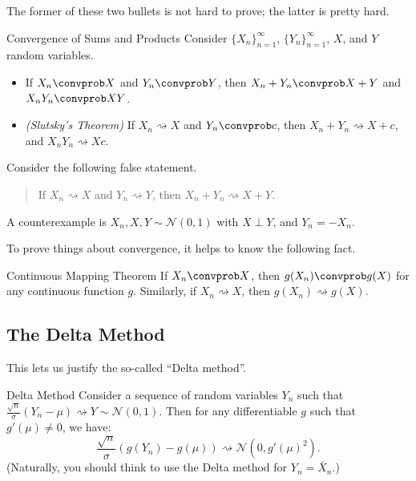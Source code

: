 The former of these two bullets is not hard to prove; the latter is pretty hard.

\begin{theorem}{Convergence of Sums and Products}
    Consider $\{X_n\}_{n = 1}^{\infty}$, $\{Y_n\}_{n = 1}^{\infty}$,
    $X$, and $Y$ random variables.
    \begin{itemize}
        \item If $X_n \convprob X$ and
        $Y_n \convprob Y$, then $X_n + Y_n \convprob X + Y$
        and $X_nY_n \convprob XY$.
        \item \emph{(Slutsky's Theorem)} If $X_n \rightsquigarrow X$ and
        $Y_n \convprob c$, then $X_n + Y_n \rightsquigarrow X + c$,
        and $X_n Y_n \rightsquigarrow Xc$.
    \end{itemize}
\end{theorem}

\begin{remark}
    Consider the following false statement.
    \begin{quote}
        If $X_n \rightsquigarrow X$ and $Y_n \rightsquigarrow Y$,
        then $X_n + Y_n \rightsquigarrow X + Y$.
    \end{quote}
    A counterexample is $X_n, X, Y \sim \mathcal{N}(0, 1)$ with $X \perp Y$,
    and $Y_n = -X_n$.
\end{remark}

To prove things about convergence, it helps to know the following fact.

\begin{theorem}{Continuous Mapping Theorem}
    If $X_n \convprob X$, then $g(X_n) \convprob g(X)$ for any continuous function $g$.
    Similarly, if $X_n \rightsquigarrow X$, then $g(X_n) \rightsquigarrow g(X)$.
\end{theorem}

\subsection{The Delta Method}

This lets us justify the so-called ``Delta method''.

\begin{theorem}{Delta Method}
    Consider a sequence of random variables $Y_n$ such that
    $\frac{\sqrt{n}}{\sigma}(Y_n - \mu) \rightsquigarrow Y \sim \mathcal{N}(0, 1)$.
    Then for any differentiable $g$ such that $g'(\mu) \neq 0$, we have:
    \[ \dfrac{\sqrt{n}}{\sigma} \left(g(Y_n) - g(\mu)\right) \rightsquigarrow \mathcal{N}(0, g'(\mu)^2). \]
    (Naturally, you should think to use the Delta method for $Y_n = \bar{X}_n$.)
\end{theorem}

